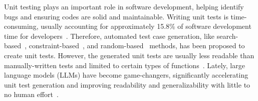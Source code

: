Unit testing plays an important role in software development, helping identify bugs and ensuring codes are solid and maintainable. Writing unit tests is time-consuming, usually accounting for approximately 15.8\% of software development time for developers~\cite{daka2014survey}. 
Therefore, automated test case generation, like search-based~\cite{fraser2011evosuite, harman2009theoretical}, constraint-based~\citep{xiao2013characteristic}, and random-based~\citep{pacheco2007feedback} methods, has been proposed to create unit tests. However, the generated unit tests are usually less readable than manually-written tests and limited to certain types of functions~\cite{grano2018empirical}. Lately, large language models (LLMs) have become game-changers, significantly accelerating unit test generation and improving readability and generalizability with little to no human effort~\cite{siddiq2024using, xie2023chatunitest}. 


